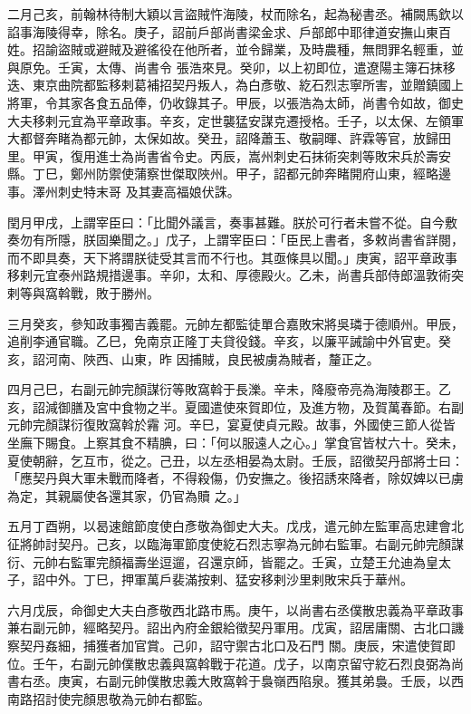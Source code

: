 \begin{pinyinscope}
 二月己亥，前翰林待制大穎以言盜賊忤海陵，杖而除名，起為秘書丞。補闕馬欽以諂事海陵得幸，除名。庚子，詔前戶部尚書梁金求、戶部郎中耶律道安撫山東百姓。招諭盜賊或避賊及避徭役在他所者，並令歸業，及時農種，無問罪名輕重，並與原免。壬寅，太傳、尚書令
 張浩來見。癸卯，以上初即位，遣遼陽主簿石抹移迭、東京曲院都監移剌葛補招契丹叛人，為白彥敬、紇石烈志寧所害，並贈鎮國上將軍，令其家各食五品俸，仍收錄其子。甲辰，以張浩為太師，尚書令如故，御史大夫移剌元宜為平章政事。辛亥，定世襲猛安謀克遷授格。壬子，以太保、左領軍大都督奔睹為都元帥，太保如故。癸丑，詔降蕭玉、敬嗣暉、許霖等官，放歸田里。甲寅，復用進士為尚書省令史。丙辰，嵩州刺史石抹術突刺等敗宋兵於壽安縣。丁巳，鄭州防禦使蒲察世傑取陜州。甲子，詔都元帥奔睹開府山東，經略邊事。澤州刺史特末哥
 及其妻高福娘伏誅。



 閏月甲戌，上謂宰臣曰：「比聞外議言，奏事甚難。朕於可行者未嘗不從。自今敷奏勿有所隱，朕固樂聞之。」戊子，上謂宰臣曰：「臣民上書者，多敕尚書省詳閱，而不即具奏，天下將謂朕徒受其言而不行也。其亟條具以聞。」庚寅，詔平章政事移剌元宜泰州路規措邊事。辛卯，太和、厚德殿火。乙未，尚書兵部侍郎溫敦術突剌等與窩斡戰，敗于勝州。



 三月癸亥，參知政事獨吉義罷。元帥左都監徒單合嘉敗宋將吳璘于德順州。甲辰，追削李通官職。乙巳，免南京正隆丁夫貸役錢。辛亥，以廉平誡諭中外官吏。癸亥，詔河南、陜西、山東，昨
 因捕賊，良民被虜為賊者，釐正之。


四月己巳，右副元帥完顏謀衍等敗窩斡于長濼。辛未，降廢帝亮為海陵郡王。乙亥，詔減御膳及宮中食物之半。夏國遣使來賀即位，及進方物，及賀萬春節。右副元帥完顏謀衍復敗窩斡於霿
 河。辛巳，宴夏使貞元殿。故事，外國使三節人從皆坐廡下賜食。上察其食不精腆，曰：「何以服遠人之心。」掌食官皆杖六十。癸未，夏使朝辭，乞互市，從之。己丑，以左丞相晏為太尉。壬辰，詔徵契丹部將士曰：「應契丹與大軍未戰而降者，不得殺傷，仍安撫之。後招誘來降者，除奴婢以已虜為定，其親屬使各還其家，仍官為贖
 之。」



 五月丁酉朔，以曷速館節度使白彥敬為御史大夫。戊戌，遣元帥左監軍高忠建會北征將帥討契丹。己亥，以臨海軍節度使紇石烈志寧為元帥右監軍。右副元帥完顏謀衍、元帥右監軍完顏福壽坐逗遛，召還京師，皆罷之。壬寅，立楚王允迪為皇太子，詔中外。丁巳，押軍萬戶裴滿按剌、猛安移剌沙里剌敗宋兵于華州。



 六月戊辰，命御史大夫白彥敬西北路市馬。庚午，以尚書右丞僕散忠義為平章政事兼右副元帥，經略契丹。詔出內府金銀給徵契丹軍用。戊寅，詔居庸關、古北口譏察契丹姦細，捕獲者加官賞。己卯，詔守禦古北口及石門
 關。庚辰，宋遣使賀即位。壬午，右副元帥僕散忠義與窩斡戰于花道。戊子，以南京留守紇石烈良弼為尚書右丞。庚寅，右副元帥僕散忠義大敗窩斡于裊嶺西陷泉。獲其弟裊。壬辰，以西南路招討使完顏思敬為元帥右都監。




\end{pinyinscope}
